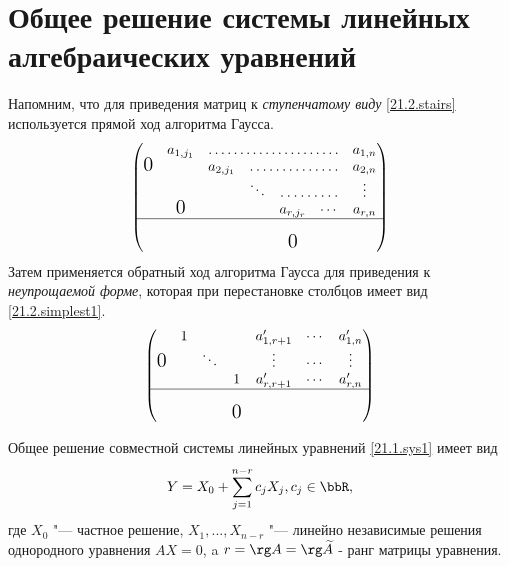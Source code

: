 \section{Общее решение системы линейных алгебраических уравнений}
  Напомним, что для приведения матриц к \textit{ступенчатому виду} \eqref{21.2.stairs} используется прямой ход алгоритма Гаусса. 
  \begin{equation}\label{21.2.stairs} 
  \begin{pmatrix}
      &a_{1,j_1}& \hdotsfor{4}          &a_{1,n}     \cr 
 \fudge 0&&a_{2,j_1} &\hdotsfor{3}      &a_{2,n}     \cr
      &   &     &\ddots&\hdotsfor{2}    &\vdots      \cr 
      &\fudge 0 && & a_{r,j_r}  &\cdots &a_{r,n}   \cr \hline
      &   &     &  &            &       &         \cr
      &   &     &  &\fudge 0    &       &         \cr
  \end{pmatrix}
  \end{equation}    
  Затем применяется обратный ход алгоритма Гаусса для приведения к \textit{неупрощаемой форме}, которая при перестановке столбцов имеет вид \eqref{21.2.simplest1}.
  \begin{equation}\label{21.2.simplest1}
  \begin{pmatrix}
      & 1 &     &   &a'_{1,r+1} &\cdots &a'_{1,n}   \cr 
    \smash{\hbox{\Large0}} & &\ddots& &\vdots &\cdots &\vdots     \cr
      &   &     & 1 &a'_{r,r+1} &\cdots &a'_{r,n}   \cr \hline
      &   &     &   &           &       &           \cr
      &   & &\smash{\hbox{\Large0}}  &        &       &           \cr
  \end{pmatrix}
  \end{equation}    
  \begin{thm}\label{21.2.th.common}
  Общее решение совместной системы линейных уравнений \eqref{21.1.sys1} имеет вид 
  \begin{equation}\label{21.2.common}
   Y=X_0+\sum_{j=1}^{n-r}c_jX_j, c_j \in \bbR,
  \end{equation}
  где $X_0$ "--- частное решение, $X_1,...,X_{n-r}$ "--- линейно независимые решения однородного уравнения $AX=0$, a $r=\rg A=\rg \widetilde A$ - ранг матрицы уравнения.
  \end{thm}
